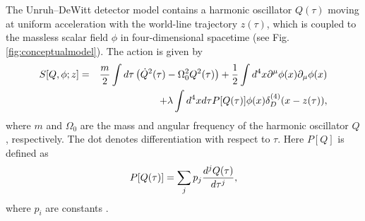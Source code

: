 \documentclass[aps,prd,preprintnumbers,nofootinbib,showpacs]{revtex4}%
\begin{document}
\begin{widetext}
The Unruh--DeWitt detector model contains a harmonic oscillator $Q(\tau)$ moving at uniform acceleration 
with the world-line trajectory $z(\tau)$, which is coupled to the
massless scalar field $\phi$ in four-dimensional spacetime  
(see Fig. \ref{fig:conceptualmodel}).
The action is given by
\begin{eqnarray}  
S[Q,\phi ; z] &=&
\frac{m}{2} \int d \tau \left( \dot{Q}^2(\tau) - \Omega_0^2 Q^2(\tau) \right) 
+ {1\over 2}\int d^4 x \partial^\mu \phi(x) \partial_\mu \phi(x)  
\nonumber \\
&&+ \lambda \int d^4 x d\tau P[Q(\tau)] \phi(x) \delta^{(4)}_D(x-z(\tau)),
\label{actionUD}
\end{eqnarray} 
where $m$ and $\Omega_0$ are the mass and angular frequency 
of the harmonic oscillator $Q$, respectively.
The dot denotes differentiation with respect to $\tau$.
Here $P[Q]$ is defined as 
\begin{eqnarray}
P[Q(\tau)]=\sum_jp_j{d^j Q(\tau)\over d\tau^j},
\label{devPQ}
\end{eqnarray}
where $p_i$ are constants \cite{IYZ2013}. 


\end{widetext}
\end{document}
